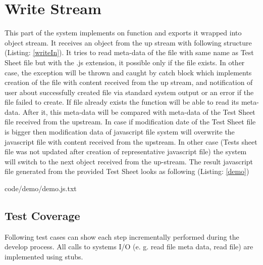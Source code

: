 \section{Write Stream}
\label{sec:write}
This part of the system implements on function and exports it wrapped into object stream. It receives an object from the up stream with following structure (Listing: \ref{writeIn}). It tries to read meta-data of the file with same name as Test Sheet file but with the .js extension, it possible only if the file exists. In other case, the exception will be thrown and caught by catch block which implements creation of the file with content received from the up stream, and notification of user about successfully created file via standard system output or an error if the file failed to create. If file already exists the function will be able to read its meta-data. After it, this meta-data will be compared with meta-data of the Test Sheet file received from the upstream. In case if modification date of the Test Sheet file is bigger then modification data of javascript file system will overwrite the javascript file with content received from the upstream. In other case (Tests sheet file was not updated after creation of representative javascript file) the system will switch to the next object received from the up-stream. The result javascript file generated from the provided Test Sheet looks as following (Listing: \ref{demo})


{code/demo/demo.js.txt}

%

\subsection{Test Coverage}
Following test cases can show each step incrementally performed during the develop process. All calls to systems I/O (e. g. read file meta data, read file) are implemented using stubs.
%


